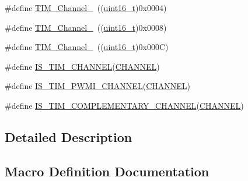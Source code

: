 \begin{DoxyCompactItemize}
\item 
\#define \hyperlink{group___t_i_m___channel_ga03d7da8269a87a560f68985b4bd80931}{T\+I\+M\+\_\+\+Channel\+\_}~((\hyperlink{_p_e___types_8h_a1f1825b69244eb3ad2c7165ddc99c956}{uint16\+\_\+t})0x0004)
\item 
\#define \hyperlink{group___t_i_m___channel_ga012711b19e8c91f6f352801a3dc0bcc9}{T\+I\+M\+\_\+\+Channel\+\_}~((\hyperlink{_p_e___types_8h_a1f1825b69244eb3ad2c7165ddc99c956}{uint16\+\_\+t})0x0008)
\item 
\#define \hyperlink{group___t_i_m___channel_ga7414888c40d066af235bc1f80b99bd9d}{T\+I\+M\+\_\+\+Channel\+\_}~((\hyperlink{_p_e___types_8h_a1f1825b69244eb3ad2c7165ddc99c956}{uint16\+\_\+t})0x000\+C)
\item 
\#define \hyperlink{group___t_i_m___channel_gae9721e3731e5fd983c83a9c1d32ef03d}{I\+S\+\_\+\+T\+I\+M\+\_\+\+C\+H\+A\+N\+N\+EL}(\hyperlink{samr21__xpro_200std__low__power__mode_200std__low__power__mode_8c_ace6a11e892466500d47d1f45f042bc53}{C\+H\+A\+N\+N\+EL})
\item 
\#define \hyperlink{group___t_i_m___channel_gacbf272b7a14f63b38bdbf18577835dce}{I\+S\+\_\+\+T\+I\+M\+\_\+\+P\+W\+M\+I\+\_\+\+C\+H\+A\+N\+N\+EL}(\hyperlink{samr21__xpro_200std__low__power__mode_200std__low__power__mode_8c_ace6a11e892466500d47d1f45f042bc53}{C\+H\+A\+N\+N\+EL})
\item 
\#define \hyperlink{group___t_i_m___channel_ga6f44459b7dfc4138bbc2c3795311c48c}{I\+S\+\_\+\+T\+I\+M\+\_\+\+C\+O\+M\+P\+L\+E\+M\+E\+N\+T\+A\+R\+Y\+\_\+\+C\+H\+A\+N\+N\+EL}(\hyperlink{samr21__xpro_200std__low__power__mode_200std__low__power__mode_8c_ace6a11e892466500d47d1f45f042bc53}{C\+H\+A\+N\+N\+EL})
\end{DoxyCompactItemize}


\subsection{Detailed Description}


\subsection{Macro Definition Documentation}
